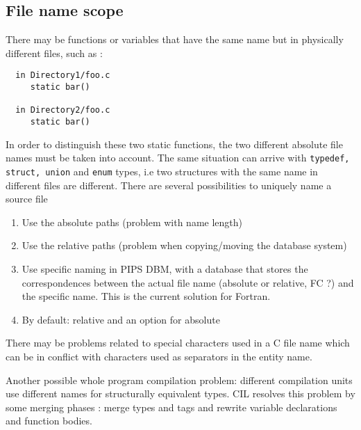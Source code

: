 \documentclass[a4paper]{article}
\begin{document}
\subsection{File name scope}
There may be functions or variables that have the same name but in physically
  different files, such as :
\begin{verbatim}
  in Directory1/foo.c   
     static bar()

  in Directory2/foo.c   
     static bar()
\end{verbatim}
In order to distinguish these two static functions, the two different absolute file names must be taken into account. The same situation can arrive with \verb/typedef, struct, union/
 and  \verb/enum/ types, i.e two structures with the same name in
 different files are different. 
There are several possibilities to uniquely name a source file
\begin{enumerate}
\item Use the absolute paths (problem with name length)
\item Use the relative paths (problem when copying/moving the
  database system)
\item Use specific naming in PIPS DBM, with a database that stores the
  correspondences between the actual file name (absolute or relative, FC
  ?) and the specific name. This is the current solution for Fortran.
\item By default: relative and an option for absolute 
\end{enumerate}
There may be problems related to special characters used
in a C file name which can be in conflict with characters used as
separators in the entity name. 

Another possible whole program compilation problem: different compilation units use different names for structurally equivalent
 types. CIL \cite{Necu02} resolves this problem by some merging phases : merge types and
 tags and rewrite variable declarations and function bodies.
\end{document}
